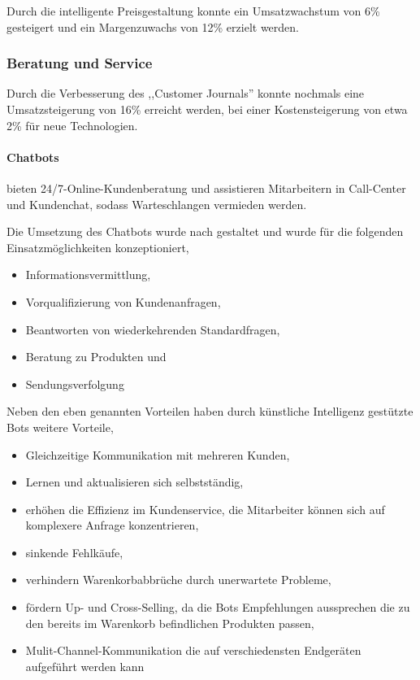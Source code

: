 Durch die intelligente Preisgestaltung konnte ein Umsatzwachstum von 6\% gesteigert und ein Margenzuwachs von 12\% erzielt werden.

\subsubsection{Beratung und Service}

Durch die Verbesserung des ,,Customer Journals'' konnte nochmals eine Umsatzsteigerung von 16\% erreicht werden, bei einer Kostensteigerung von etwa 2\% für neue Technologien.

\paragraph{Chatbots} bieten 24/7-Online-Kun\-den\-be\-ra\-tung und assistieren Mitarbeitern in Call-Center und Kundenchat, sodass Warteschlangen vermieden werden.\vspace{0.2cm}

Die Umsetzung des Chatbots wurde nach \cite{chatlogue_chatbot_tasks} gestaltet und wurde für die folgenden Einsatzmöglichkeiten konzeptioniert,

\begin{itemize}
	\item Informationsvermittlung,
	\item Vorqualifizierung von Kundenanfragen,
	\item Beantworten von wiederkehrenden Standardfragen,
	\item Beratung zu Produkten und
	\item Sendungsverfolgung
\end{itemize} 

Neben den eben genannten Vorteilen haben durch künstliche Intelligenz gestützte Bots weitere Vorteile,

\begin{itemize}
	\item Gleichzeitige Kommunikation mit mehreren Kunden,
	\item Lernen und aktualisieren sich selbstständig,
	\item erhöhen die Effizienz im Kundenservice, die Mitarbeiter können sich auf komplexere Anfrage konzentrieren,
	\item sinkende Fehlkäufe,
	\item verhindern Warenkorbabbrüche durch unerwartete Probleme,
	\item fördern Up- und Cross-Selling, da die Bots Empfehlungen aussprechen die zu den bereits im Warenkorb befindlichen Produkten passen,
	\item Mulit-Channel-Kommunikation die auf verschiedensten Endgeräten aufgeführt werden kann 
\end{itemize}

